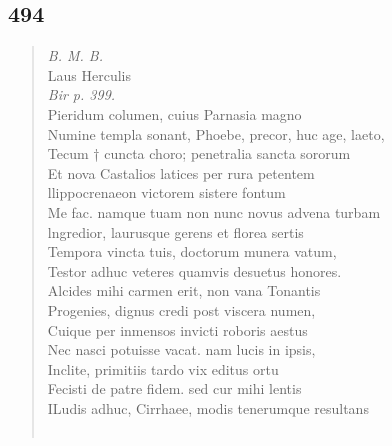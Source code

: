 \documentclass[11pt, a4paper]{report}
\begin{document}
            \subsection*{494}
      \begin{verse}
      \textit{B. M. B.} \\ Laus Herculis \\ \textit{Bir p. 399.} \\ Pieridum columen, cuius Parnasia magno \\ Numine templa sonant, Phoebe, precor, huc age, laeto, \\ Tecum † cuncta choro; penetralia sancta sororum \\ Et nova Castalios latices per rura petentem \\ llippocrenaeon victorem sistere fontum \\ Me fac. namque tuam non nunc novus advena turbam \\ lngredior, laurusque gerens et florea sertis \\ Tempora vincta tuis, doctorum munera vatum, \\ Testor adhuc veteres quamvis desuetus honores. \\ Alcides mihi carmen erit, non vana Tonantis \\ Progenies, dignus credi post viscera numen, \\ Cuique per inmensos invicti roboris aestus \\ Nec nasci potuisse vacat. nam lucis in ipsis, \\ Inclite, primitiis tardo vix editus ortu \\ Fecisti de patre fidem. sed cur mihi lentis \\ ILudis adhuc, Cirrhaee, modis tenerumque resultans \\ 
        ﻿\pagebreak 

\end{verse}
\end{document}
